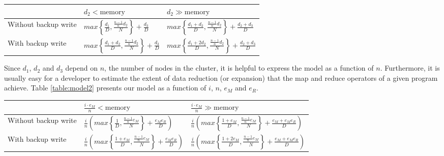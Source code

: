 \documentclass{acm_proc_article-sp}
\begin{document}
\begin{table*}
\centering
\renewcommand{\arraystretch}{1.2}
\begin{tabular}{|l|l|l|}
\hline
& $d_2 < \text{memory}$ & $d_2 \gg \text{memory}$ \\ \hline
Without backup write & $max\left\{\frac{d_1}{D},
\frac{\frac{n-1}{n} d_2}{N}\right\} + \frac{d_3}{D}$ & $max\left\{\frac{d_1 +
d_2}{D}, \frac{\frac{n-1}{n} d_2}{N}\right\} + \frac{d_2 + d_3}{D}$ \\ \hline
With backup write & $max\left\{\frac{d_1 + d_2}{D}, \frac{\frac{n-1}{n} d_2}{N}\right\} +
\frac{d_3}{D}$ & $max\left\{\frac{d_1 + 2 d_2}{D},
\frac{\frac{n-1}{n} d_2}{N}\right\} + \frac{d_2 + d_3}{D}$ \\ \hline
\end{tabular}
\caption{The execution time of a map-reduce computation on a parallel dataflow system. $D$ and $N$ are the disk and network throughputs of a single node, respectively.}
\label{table:model1}
\end{table*}

Since $d_1$, $d_2$ and $d_3$ depend on $n$, the number of nodes in the cluster, it is helpful to express the model as a function of $n$. Furthermore, it is usually easy for a developer to estimate  the extent of data reduction (or expansion) that the map and reduce operators of a given program achieve. Table \ref{table:model2} presents our model as a function of $i$, $n$, $e_M$ and $e_R$.

\begin{table*}
\centering
\renewcommand{\arraystretch}{1.2}
\begin{tabular}{|l|l|l|}
\hline
& $\frac{i \cdot e_M}{n}< \text{memory}$ & $\frac{i \cdot e_M}{n} \gg \text{memory}$ \\ \hline
Without backup write & $\frac{i}{n} \left( max\left\{\frac{1}{D},
\frac{\frac{n-1}{n} e_M}{N}\right\} + \frac{e_M e_R}{D} \right)$ & $\frac{i}{n}
\left( max\left\{\frac{1 + e_M}{D}, \frac{\frac{n-1}{n} e_M}{N}\right\} +
\frac{e_M + e_M e_R}{D} \right)$ \\ \hline With backup write & $\frac{i}{n}
\left( max\left\{\frac{1 + e_M}{D}, \frac{\frac{n-1}{n} e_M}{N}\right\} +
\frac{e_M e_R}{D} \right)$ & $\frac{i}{n} \left( max\left\{\frac{1 + 2 e_M}{D},
\frac{\frac{n-1}{n} e_M}{N}\right\} + \frac{e_M + e_M e_R}{D} \right)$ \\ \hline
\end{tabular}
\caption{The execution time of a map-reduce computation on a parallel dataflow system, as a function of the total amount of input data ($i$), and the map-reduce data expansion ratios ($e_M$ and $e_R$).}
\label{table:model2}
\end{table*}
\end{document}
